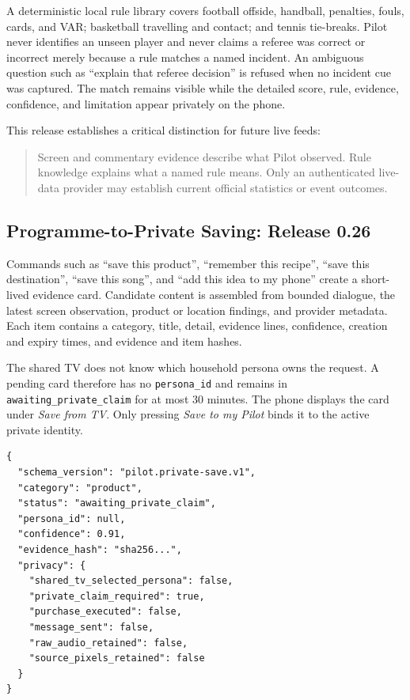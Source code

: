 A deterministic local rule library covers football offside, handball,
penalties, fouls, cards, and VAR; basketball travelling and contact; and tennis
tie-breaks.  Pilot never identifies an unseen player and never claims a referee
was correct or incorrect merely because a rule matches a named incident.  An
ambiguous question such as ``explain that referee decision'' is refused when no
incident cue was captured.  The match remains visible while the detailed score,
rule, evidence, confidence, and limitation appear privately on the phone.

This release establishes a critical distinction for future live feeds:

\begin{quote}
Screen and commentary evidence describe what Pilot observed.  Rule knowledge
explains what a named rule means.  Only an authenticated live-data provider may
establish current official statistics or event outcomes.
\end{quote}

\subsection{Programme-to-Private Saving: Release 0.26}

Commands such as ``save this product'', ``remember this recipe'', ``save this
destination'', ``save this song'', and ``add this idea to my phone'' create a
short-lived evidence card.  Candidate content is assembled from bounded dialogue,
the latest screen observation, product or location findings, and provider
metadata.  Each item contains a category, title, detail, evidence lines,
confidence, creation and expiry times, and evidence and item hashes.

The shared TV does not know which household persona owns the request.  A pending
card therefore has no \texttt{persona\_id} and remains in
\texttt{awaiting\_private\_claim} for at most 30 minutes.  The phone displays the
card under \emph{Save from TV}.  Only pressing \emph{Save to my Pilot} binds it
to the active private identity.

\begin{verbatim}
{
  "schema_version": "pilot.private-save.v1",
  "category": "product",
  "status": "awaiting_private_claim",
  "persona_id": null,
  "confidence": 0.91,
  "evidence_hash": "sha256...",
  "privacy": {
    "shared_tv_selected_persona": false,
    "private_claim_required": true,
    "purchase_executed": false,
    "message_sent": false,
    "raw_audio_retained": false,
    "source_pixels_retained": false
  }
}
\end{verbatim}

